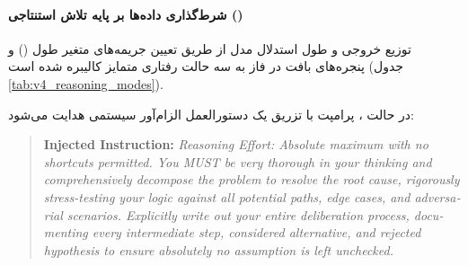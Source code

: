 \paragraph*{شرط‌گذاری داده‌ها بر پایه تلاش استنتاجی ()}
توزیع خروجی و طول استدلال مدل از طریق تعیین جریمه‌های متغیر طول () و پنجره‌های بافت در فاز  به سه حالت رفتاری متمایز کالیبره شده است (جدول \ref{tab:v4_reasoning_modes}).

\begin{table}[htbp]
\centering
\caption{مقایسه حالات سه‌گانه تلاش استنتاجی و الزامات ساختاری داده‌ها در }
\label{tab:v4_reasoning_modes}
\end{table}

در حالت ، پرامپت با تزریق یک دستورالعمل الزام‌آور سیستمی هدایت می‌شود:
\begin{latin}
\begin{quote}
\small
\textbf{Injected Instruction:} \textit{Reasoning Effort: Absolute maximum with no shortcuts permitted. You MUST be very thorough in your thinking and comprehensively decompose the problem to resolve the root cause, rigorously stress-testing your logic against all potential paths, edge cases, and adversarial scenarios. Explicitly write out your entire deliberation process, documenting every intermediate step, considered alternative, and rejected hypothesis to ensure absolutely no assumption is left unchecked.}
\end{quote}
\end{latin}

